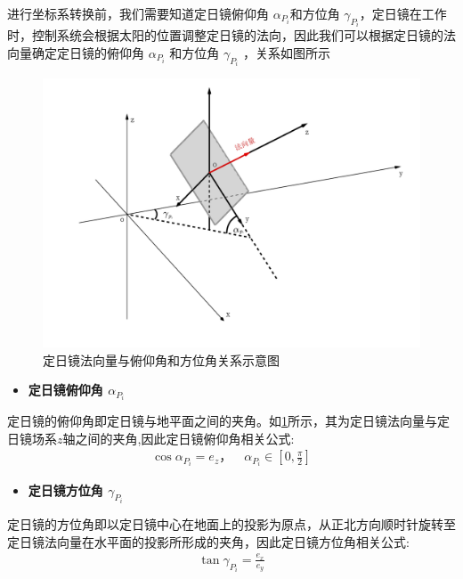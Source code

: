 \documentclass[../main.tex]{subfiles}
\begin{document}
\par 进行坐标系转换前，我们需要知道定日镜俯仰角 $\alpha_{P_{i}}$和方位角 $\gamma_{P_{i}}$，定日镜在工作时，控制系统会根据太阳的位置调整定日镜的法向，因此我们可以根据定日镜的法向量确定定日镜的俯仰角 $\alpha_{P_{i}}$ 和方位角 $\gamma_{P_{i}}$ ，关系如图所示
   \begin{figure}[H]
    \centering
    \includegraphics[width=.8\textwidth]{4}
    \caption{定日镜法向量与俯仰角和方位角关系示意图}
    \label{1.12}
\end{figure} 


\begin{itemize}
  \item \textbf{定日镜俯仰角 $\alpha_{P_{i}}$ }
  \end{itemize}
  \par 定日镜的俯仰角即定日镜与地平面之间的夹角。如\cref{1.12}所示，其为定日镜法向量与定日镜场系$z$轴之间的夹角,因此定日镜俯仰角相关公式:
\begin{align}    \label{1.13}
\cos\alpha_{P_i} = e_z，\quad \alpha_{P_{i}} \in [0, \frac{\pi}{2}]
\end{align}

\begin{itemize}
  \item \textbf{定日镜方位角 $\gamma_{P_{i}}$  }
  \end{itemize}
  \par 定日镜的方位角即以定日镜中心在地面上的投影为原点，从正北方向顺时针旋转至定日镜法向量在水平面的投影所形成的夹角，因此定日镜方位角相关公式:
    \begin{align}    \label{1.14}
\tan\gamma_{P_i} = \frac{e_{x}}{e_{y}}
\end{align}               
\end{document}
